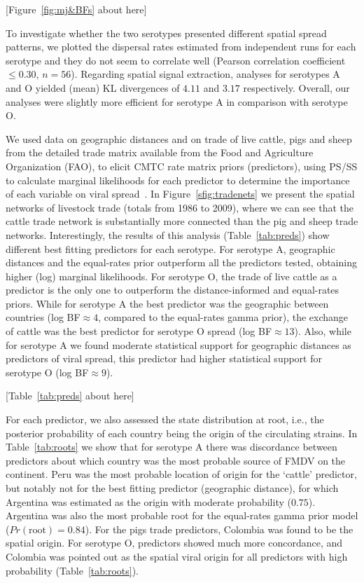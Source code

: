 \documentclass[10pt]{article}
\begin{document}
\begin{center}
 [Figure~\ref{fig:mj&BFs} about here]
\end{center}

To investigate whether the two serotypes presented different spatial spread patterns, we plotted the dispersal rates estimated from independent runs for each serotype and they do not seem to correlate well (Pearson correlation coefficient $\leq 0.30$, $n = 56$).
Regarding spatial signal extraction, analyses for serotypes  A and O yielded (mean) KL divergences of $4.11$ and $3.17$ respectively.
Overall, our analyses were slightly more efficient for serotype A in comparison with serotype O.

We used data on geographic distances and on trade of live cattle, pigs and sheep from the detailed trade matrix available from the Food and Agriculture Organization (FAO), to elicit CMTC rate matrix priors (predictors), using PS/SS to calculate marginal likelihoods for each predictor to determine the importance of each variable on viral spread~\cite{Carvalho2013, Nelson2011}.
In Figure~\ref{sfig:tradenets} we present the spatial networks of livestock trade (totals from 1986 to 2009), where we can see that the cattle trade network is substantially more connected than the pig and sheep trade networks.
Interestingly, the results of this analysis (Table~\ref{tab:preds}) show different best fitting predictors for each serotype.
For serotype A, geographic distances and the equal-rates prior outperform all the predictors tested, obtaining higher (log) marginal likelihoods.
For serotype O, the trade of live cattle as a predictor is the only one to outperform the distance-informed and equal-rates  priors.
While for serotype A the best predictor was the geographic between countries (log BF$\approx 4$, compared to the equal-rates gamma prior), the exchange of cattle was the best predictor for serotype O spread (log BF$\approx 13$).
Also, while for serotype A we found moderate statistical support for geographic distances as predictors of viral spread, this predictor had higher statistical support for serotype O (log BF$\approx 9$).

\begin{center}
 [Table~\ref{tab:preds} about here]
\end{center}

For each predictor, we also assessed the state distribution at root, i.e., the posterior probability of each country being the origin of the circulating strains.
In Table~\ref{tab:roots} we show that for serotype A there was discordance between predictors about which country was the most probable source of FMDV on the continent.
Peru was the most probable location of origin for the `cattle' predictor, but notably not for the best fitting predictor (geographic distance), for which Argentina was estimated as the origin with moderate probability ($0.75$).
Argentina was also the most probable root for the equal-rates gamma prior model ($Pr(\text{root})=0.84$).
For the pigs trade predictors, Colombia was found to be the spatial origin.
For serotype O, predictors showed much more concordance, and Colombia was pointed out as the spatial viral origin for all predictors with high probability (Table~\ref{tab:roots}).
\end{document}
